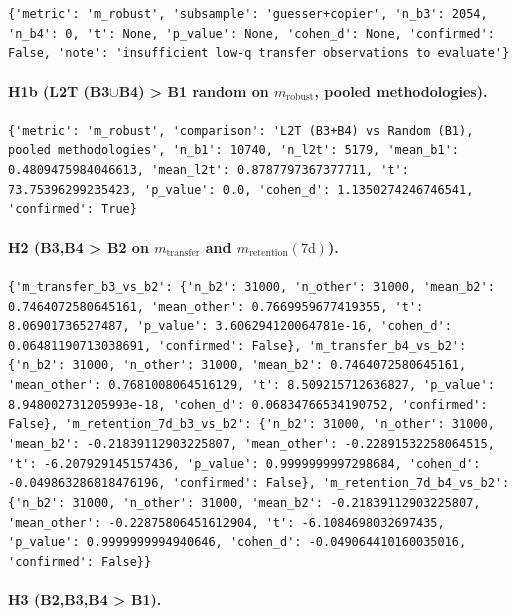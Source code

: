 \verb|{'metric': 'm_robust', 'subsample': 'guesser+copier', 'n_b3': 2054, 'n_b4': 0, 't': None, 'p_value': None, 'cohen_d': None, 'confirmed': False, 'note': 'insufficient low-q transfer observations to evaluate'}|\par

\paragraph{H1b (L2T (B3$\cup$B4) > B1 random on $m_{\mathrm{robust}}$, pooled methodologies).}

\verb|{'metric': 'm_robust', 'comparison': 'L2T (B3+B4) vs Random (B1), pooled methodologies', 'n_b1': 10740, 'n_l2t': 5179, 'mean_b1': 0.4809475984046613, 'mean_l2t': 0.8787797367377711, 't': 73.75396299235423, 'p_value': 0.0, 'cohen_d': 1.1350274246746541, 'confirmed': True}|\par

\paragraph{H2 (B3,B4 > B2 on $m_{\mathrm{transfer}}$ and $m_{\mathrm{retention}}(7\mathrm{d})$).}

\verb|{'m_transfer_b3_vs_b2': {'n_b2': 31000, 'n_other': 31000, 'mean_b2': 0.7464072580645161, 'mean_other': 0.7669959677419355, 't': 8.06901736527487, 'p_value': 3.606294120064781e-16, 'cohen_d': 0.06481190713038691, 'confirmed': False}, 'm_transfer_b4_vs_b2': {'n_b2': 31000, 'n_other': 31000, 'mean_b2': 0.7464072580645161, 'mean_other': 0.7681008064516129, 't': 8.509215712636827, 'p_value': 8.948002731205993e-18, 'cohen_d': 0.06834766534190752, 'confirmed': False}, 'm_retention_7d_b3_vs_b2': {'n_b2': 31000, 'n_other': 31000, 'mean_b2': -0.21839112903225807, 'mean_other': -0.22891532258064515, 't': -6.207929145157436, 'p_value': 0.9999999997298684, 'cohen_d': -0.049863286818476196, 'confirmed': False}, 'm_retention_7d_b4_vs_b2': {'n_b2': 31000, 'n_other': 31000, 'mean_b2': -0.21839112903225807, 'mean_other': -0.22875806451612904, 't': -6.1084698032697435, 'p_value': 0.9999999994940646, 'cohen_d': -0.049064410160035016, 'confirmed': False}}|\par

\paragraph{H3 (B2,B3,B4 > B1).}

